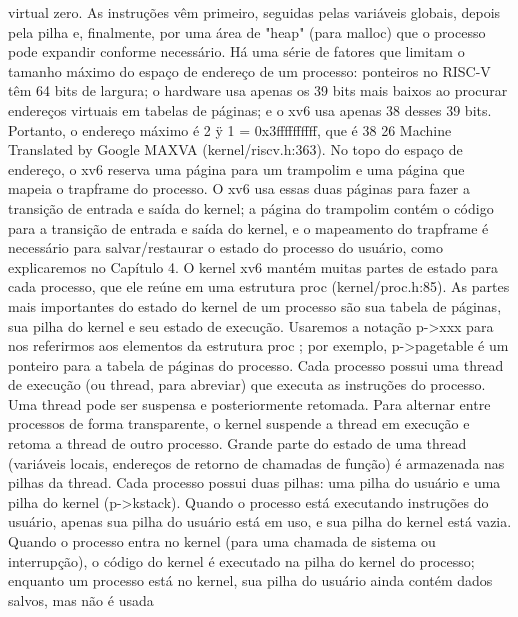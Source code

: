 virtual  zero.  As  instruções  vêm  primeiro,  seguidas  pelas  variáveis  globais,  depois  pela  pilha  e,  finalmente,  por  uma  área  de  
"heap"  (para  malloc)  que  o  processo  pode  expandir  conforme  necessário.  Há  uma  série  de  fatores  que  limitam  o  tamanho  
máximo  do  espaço  de  endereço  de  um  processo:  ponteiros  no  RISC-V  têm  64  bits  de  largura;  o  hardware  usa  apenas  os  39  
bits  mais  baixos  ao  procurar  endereços  virtuais  em  tabelas  de  páginas;  e  o  xv6  usa  apenas  38  desses  39  bits.  Portanto,  o  
endereço  máximo  é  2  ÿ  1  =  0x3ffffffffff,  que  é
 38
 26
Machine Translated by Google
 MAXVA  (kernel/riscv.h:363).  No  topo  do  espaço  de  endereço,  o  xv6  reserva  uma  página  para  um  trampolim  e  uma  
página  que  mapeia  o  trapframe  do  processo.  O  xv6  usa  essas  duas  páginas  para  fazer  a  transição  de  entrada  e  
saída  do  kernel;  a  página  do  trampolim  contém  o  código  para  a  transição  de  entrada  e  saída  do  kernel,  e  o  
mapeamento  do  trapframe  é  necessário  para  salvar/restaurar  o  estado  do  processo  do  usuário,  como  explicaremos  no  Capítulo  4.
 O  kernel  xv6  mantém  muitas  partes  de  estado  para  cada  processo,  que  ele  reúne  em  uma  estrutura  proc
 (kernel/proc.h:85).  As  partes  mais  importantes  do  estado  do  kernel  de  um  processo  são  sua  tabela  de  páginas,  sua  pilha  
do  kernel  e  seu  estado  de  execução.  Usaremos  a  notação  p->xxx  para  nos  referirmos  aos  elementos  da  estrutura  proc ;  
por  exemplo,  p->pagetable  é  um  ponteiro  para  a  tabela  de  páginas  do  processo.
 Cada  processo  possui  uma  thread  de  execução  (ou  thread,  para  abreviar)  que  executa  as  instruções  do  processo.  
Uma  thread  pode  ser  suspensa  e  posteriormente  retomada.  Para  alternar  entre  processos  de  forma  transparente,  o  kernel  
suspende  a  thread  em  execução  e  retoma  a  thread  de  outro  processo.  Grande  parte  do  estado  de  uma  thread  (variáveis  
locais,  endereços  de  retorno  de  chamadas  de  função)  é  armazenada  nas  pilhas  da  thread.
 Cada  processo  possui  duas  pilhas:  uma  pilha  do  usuário  e  uma  pilha  do  kernel  (p->kstack).  Quando  o  processo  está  
executando  instruções  do  usuário,  apenas  sua  pilha  do  usuário  está  em  uso,  e  sua  pilha  do  kernel  está  vazia.  Quando  o  
processo  entra  no  kernel  (para  uma  chamada  de  sistema  ou  interrupção),  o  código  do  kernel  é  executado  na  pilha  do  kernel  
do  processo;  enquanto  um  processo  está  no  kernel,  sua  pilha  do  usuário  ainda  contém  dados  salvos,  mas  não  é  usada  
